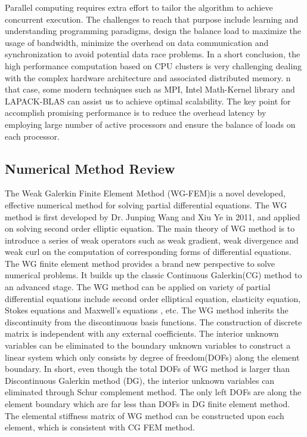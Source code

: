 Parallel computing requires extra effort to tailor the algorithm to achieve concurrent execution. The challenges to reach that purpose include learning and understanding programming paradigms, design the balance load to maximize the usage of bandwidth, minimize the overhead on data communication and synchronization to avoid potential data race problems. In a short conclusion, the high performance computation based on CPU clusters is very challenging dealing with the complex hardware architecture and associated distributed memory. n that case, some modern techniques such as MPI, Intel Math-Kernel library and LAPACK-BLAS can assist us to achieve optimal scalability. The key point for accomplish promising performance is to reduce the overhead latency by employing large number of active processors and ensure the balance of loads on each processor.

\subsection{Numerical Method Review}

The Weak Galerkin Finite Element Method (WG-FEM)is a novel developed, effective numerical method for solving partial differential equations. The WG method is first developed by Dr. Junping Wang and Xiu Ye in 2011, and applied on solving second order elliptic equation\cite{wang2014weak}. The main theory of WG method is to introduce a series of weak operators such as weak gradient, weak divergence and weak curl on the computation of corresponding forms of differential equations. The WG finite element method provides a  brand new perspective to solve numerical problems. It builds up the classic Continuous Galerkin(CG) method to an advanced stage. The WG method can be applied on variety of partial differential equations include second order elliptical equation, elasticity equation\cite{wang2016locking}, Stokes equations \cite{wang2016weak} and Maxwell's equations \cite{mu2013weak}, etc. The WG method inherits the discontinuity from the discontinuous basis functions. The construction of discrete matrix is independent with any external coefficients. The interior unknown variables can be eliminated to the boundary unknown variables to construct a linear system which only consists by degree of freedom(DOFs) along the element boundary. In short, even though the total DOFs of WG method is larger than Discontinuous Galerkin method (DG), the interior unknown variables can eliminated through Schur complement method. The only left DOFs are along the element boundary which are far less than DOFs in DG finite element method. The elemental stiffness matrix of WG method can be constructed upon each element, which is consistent with CG FEM method. 

